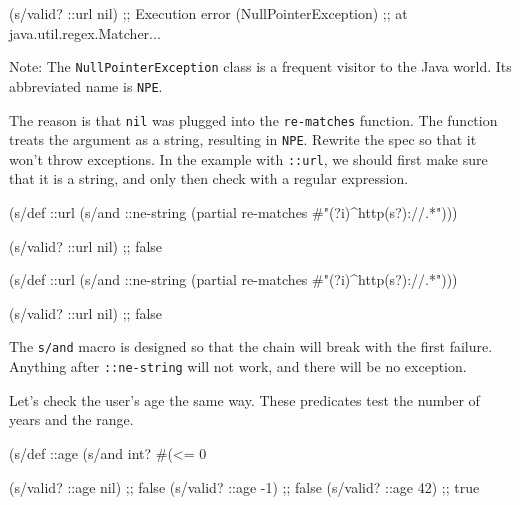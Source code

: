 
\begin{english}
  \begin{clojure}
(s/valid? ::url nil)
;; Execution error (NullPointerException)
;; at java.util.regex.Matcher...
  \end{clojure}
\end{english}


Note: The  \verb|NullPointerException| class is a frequent visitor to the Java world. Its abbreviated name is \verb|NPE|.

The reason is that \verb|nil| was plugged into the \verb|re-matches| function. The function treats the argument as a string, resulting in \verb|NPE|. Rewrite the spec so that it won't throw exceptions. In the example with \verb|::url|, we should first make sure that it is a string, and only then check with a regular expression.

\ifx\DEVICETYPE\MOBILE

\begin{english}
  \begin{clojure}
(s/def ::url
  (s/and ::ne-string
         (partial re-matches
           #"(?i)^http(s?)://.*")))

(s/valid? ::url nil) ;; false
  \end{clojure}
\end{english}

\else

\begin{english}
  \begin{clojure}
(s/def ::url
  (s/and ::ne-string
         (partial re-matches #"(?i)^http(s?)://.*")))

(s/valid? ::url nil) ;; false
  \end{clojure}
\end{english}

\fi


The \verb|s/and| macro is designed so that the chain will break with the first failure. Anything after \verb|::ne-string| will not work, and there will be no exception.

Let's check the user's age the same way. These predicates test the number of years and the range.

\begin{english}
  \begin{clojure}
(s/def ::age
  (s/and int? #(<= 0 %

(s/valid? ::age nil) ;; false
(s/valid? ::age -1)  ;; false
(s/valid? ::age 42)  ;; true
  \end{clojure}
\end{english}

